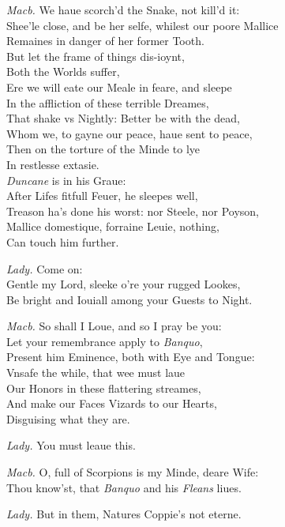 \documentclass[12pt]{sides}
\newcommand{\dia}[1]{\hskip 15pt\textit{#1}\hskip 6pt}
\begin{document}
\begin{multicols}{2}
            \dia{Macb.} We haue scorch'd the Snake, not kill'd it: \\ Shee'le close, and be her selfe, whilest our poore Mallice \\ Remaines in danger of her former Tooth. \\ But let the frame of things dis-ioynt, \\ Both the Worlds suffer, \\ Ere we will eate our Meale in feare, and sleepe \\ In the affliction of these terrible Dreames, \\ That shake vs Nightly: Better be with the dead, \\ Whom we, to gayne our peace, haue sent to peace, \\ Then on the torture of the Minde to lye \\ In restlesse extasie. \\ \textit{Duncane} is in his Graue: \\ After Lifes fitfull Feuer, he sleepes well, \\ Treason ha's done his worst: nor Steele, nor Poyson, \\ Mallice domestique, forraine Leuie, nothing, \\ Can touch him further.

            \dia{Lady.} Come on: \\ Gentle my Lord, sleeke o're your rugged Lookes, \\ Be bright and Iouiall among your Guests to Night.

            \dia{Macb.} So shall I Loue, and so I pray be you: \\ Let your remembrance apply to \textit{Banquo}, \\ Present him Eminence, both with Eye and Tongue: \\ Vnsafe the while, that wee must laue \\ Our Honors in these flattering streames, \\ And make our Faces Vizards to our Hearts, \\ Disguising what they are.

            \dia{Lady.} You must leaue this.

            \dia{Macb.} O, full of Scorpions is my Minde, deare Wife: \\ Thou know'st, that \textit{Banquo} and his \textit{Fleans} liues.

            \dia{Lady.} But in them, Natures Coppie's not eterne.


\end{multicols}
\end{document}
